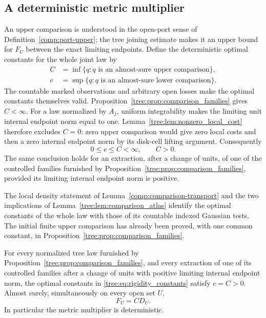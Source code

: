 \subsection{A deterministic metric multiplier}
\label{tree:sec:rigidity}

An upper comparison is understood in the open-port sense of
Definition~\ref{comp:port-upper}; the tree joining estimate makes it
an upper bound for $F_U$ between the exact limiting endpoints.
Define the deterministic optimal constants for the whole joint law by
\begin{equation}\label{tree:eq:rigidity_constants}
 \begin{aligned}
 C&=\inf\{q:q\text{ is an almost-sure upper comparison}\},\\
 c&=\sup\{q:q\text{ is an almost-sure lower comparison}\}.
 \end{aligned}
\end{equation}
The countable marked observations and arbitrary open losses make the
optimal constants themselves valid. Proposition~\ref{tree:prop:comparison_families}
gives $C<\infty$. For a law normalized by $A_j$, uniform integrability
makes the limiting unit internal endpoint norm equal to one.
Lemma~\ref{tree:lem:nonzero_local_cost} therefore excludes $C=0$:
zero upper comparison would give zero local costs and then a zero
internal endpoint norm by its disk-cell lifting argument. Consequently
\begin{equation}\label{tree:eq:rigidity_initial_comparison}
                 0\le c\le C<\infty,\qquad C>0.
\end{equation}
The same conclusion holds for an extraction, after a change of units,
of one of the controlled families furnished by
Proposition~\ref{tree:prop:comparison_families}, provided its limiting
internal endpoint norm is positive.

The local density statement of Lemma~\ref{comp:comparison-transport}
and the two implications of Lemma~\ref{tree:lem:comparison_atlas}
identify the optimal constants of the whole law with those of its
countable indexed Gaussian tests. The initial finite upper comparison
has already been proved, with one common constant, in
Proposition~\ref{tree:prop:comparison_families}.

\begin{theorem}
\label{tree:thm:rigidity}
For every normalized tree law furnished by
Proposition~\ref{tree:prop:comparison_families}, and every extraction of
one of its controlled families after a change of units with positive
limiting internal endpoint norm, the optimal constants in
\eqref{tree:eq:rigidity_constants} satisfy $c=C>0$.
Almost surely, simultaneously on every open set $U$,
\[
                         F_U=C D_U.
\]
In particular the metric multiplier is deterministic.
\end{theorem}


